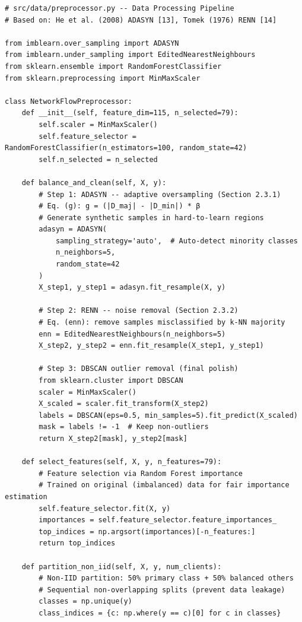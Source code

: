 \documentclass[12pt,a4paper]{article}
\begin{document}
\begin{lstlisting}[caption=Data Preprocessor, label=lst:preprocessor]
# src/data/preprocessor.py -- Data Processing Pipeline
# Based on: He et al. (2008) ADASYN [13], Tomek (1976) RENN [14]

from imblearn.over_sampling import ADASYN
from imblearn.under_sampling import EditedNearestNeighbours
from sklearn.ensemble import RandomForestClassifier
from sklearn.preprocessing import MinMaxScaler

class NetworkFlowPreprocessor:
    def __init__(self, feature_dim=115, n_selected=79):
        self.scaler = MinMaxScaler()
        self.feature_selector = RandomForestClassifier(n_estimators=100, random_state=42)
        self.n_selected = n_selected

    def balance_and_clean(self, X, y):
        # Step 1: ADASYN -- adaptive oversampling (Section 2.3.1)
        # Eq. (g): g = (|D_maj| - |D_min|) * β
        # Generate synthetic samples in hard-to-learn regions
        adasyn = ADASYN(
            sampling_strategy='auto',  # Auto-detect minority classes
            n_neighbors=5,
            random_state=42
        )
        X_step1, y_step1 = adasyn.fit_resample(X, y)

        # Step 2: RENN -- noise removal (Section 2.3.2)
        # Eq. (enn): remove samples misclassified by k-NN majority
        enn = EditedNearestNeighbours(n_neighbors=5)
        X_step2, y_step2 = enn.fit_resample(X_step1, y_step1)

        # Step 3: DBSCAN outlier removal (final polish)
        from sklearn.cluster import DBSCAN
        scaler = MinMaxScaler()
        X_scaled = scaler.fit_transform(X_step2)
        labels = DBSCAN(eps=0.5, min_samples=5).fit_predict(X_scaled)
        mask = labels != -1  # Keep non-outliers
        return X_step2[mask], y_step2[mask]

    def select_features(self, X, y, n_features=79):
        # Feature selection via Random Forest importance
        # Trained on original (imbalanced) data for fair importance estimation
        self.feature_selector.fit(X, y)
        importances = self.feature_selector.feature_importances_
        top_indices = np.argsort(importances)[-n_features:]
        return top_indices

    def partition_non_iid(self, X, y, num_clients):
        # Non-IID partition: 50% primary class + 50% balanced others
        # Sequential non-overlapping splits (prevent data leakage)
        classes = np.unique(y)
        class_indices = {c: np.where(y == c)[0] for c in classes}


\end{lstlisting}
\end{document}
